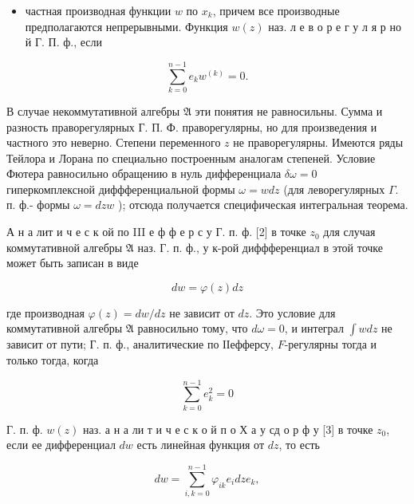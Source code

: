 \documentclass[10pt]{article}
\begin{document}
\begin{itemize}

  \item частная производная функции $w$ по $x_{k}$, причем все производные предполагаются непрерывными. Функция $w(z)$ наз. л е в о р е г у л я р но й Г. П. ф., если

\end{itemize}



\[

\sum_{k=0}^{n-1} e_{k} w^{(k)}=0 .

\]



В случае некоммутативной алгебры $\mathfrak{A}$ эти понятия не равносильны. Сумма и разность праворегулярных Г. П. Ф. праворегулярны, но для произведения и частного это неверно. Степени переменного $z$ не праворегулярны. Имеются ряды Тейлора и Лорана по специально построенным аналогам степеней. Условие Фютера равносильно обращению в нуль дифференциала $\delta \omega=0$ гиперкомплексной диффференциальной формы $\omega=w d z$ (для леворегулярных $\Gamma$. п. ф.- формы $\omega=d z w$ ); отсюда получается специфическая интегральная теорема.



А н а лит и ч е с к ой по III е ф ф е р с у Г. п. ф. [2] в точке $z_{0}$ для случая коммутативной алгебры $\mathfrak{A}$ наз. Г. п. ф., у к-рой диффференциал в этой точке может быть записан в виде



\[

d w=\varphi(z) d z

\]



где производная $\varphi(z)=d w / d z$ не зависит от $d z$. Это условие для коммутативной алгебры $\mathfrak{A}$ равносильно тому, что $d \omega=0$, и интеграл $\int w d z$ не зависит от пути; Г. п. ф., аналитические по ІІефферсу, $F$-регулярны тогда и только тогда, когда



\[

\sum_{k=0}^{n-1} e_{k}^{2}=0

\]



Г. п. ф. $w(z)$ наз. а н а ли т и ч е с к о й п о Х а у сд о р ф у [3] в точке $z_{0}$, если ее дифференциал $d w$ есть линейная функция от $d z$, то есть



\[

d w=\sum_{i, k=0}^{n-1} \varphi_{i k} e_{i} d z e_{k},

\]
\end{document}
